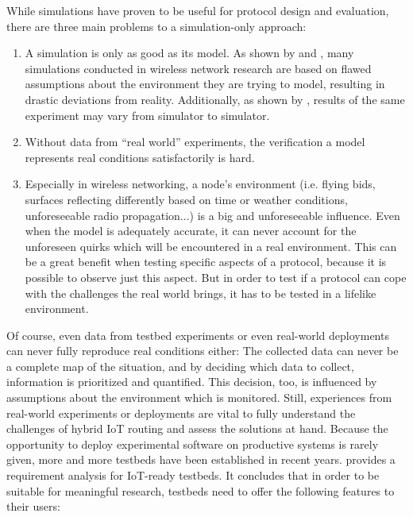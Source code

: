 \documentclass[a4paper,10pt]{scrartcl}
\begin{document}
While simulations have proven to be useful for protocol design and evaluation, there are three main problems to a simulation-only approach: 
\begin{enumerate}
\item A simulation is only as good as its model. As shown by \cite{mistaken-axioms} and \cite{exp_eval_wsn_assumptions}, many simulations conducted in wireless network research are based on flawed assumptions about the environment they are trying to model, resulting in drastic deviations from reality. Additionally, as shown by \cite{sim_accuracy}, results of the same experiment may vary from simulator to simulator.
\item Without data from ``real world'' experiments, the verification  a model represents real conditions satisfactorily is hard.
\item Especially in wireless networking, a node's environment (i.e. flying bids, surfaces reflecting differently based on time or weather conditions, unforeseeable radio propagation...) is a big and unforeseeable influence. Even when the model is adequately accurate, it can never account for the unforeseen quirks which will be encountered in a real environment. This can be a great benefit when testing specific aspects of a protocol, because it is possible to observe just this aspect. But in order to test if a protocol can cope with the challenges the real world brings, it has to be tested in a lifelike environment.
\end{enumerate}
Of course, even data from testbed experiments or even real-world deployments can never fully reproduce real conditions either: The collected data can never be a complete map of the situation, and by deciding which data to collect, information is prioritized and quantified. This decision, too, is influenced by assumptions about the environment which is monitored.
Still, experiences from real-world experiments or deployments are vital to fully understand the challenges of hybrid IoT routing and assess the solutions at hand. Because the opportunity to deploy experimental software on productive systems is rarely given, more and more testbeds have been established in recent years. \cite{testbed-survey} provides a requirement analysis for IoT-ready testbeds. It concludes that in order to be suitable for meaningful research, testbeds need to offer the following features to their users:
\end{document}
